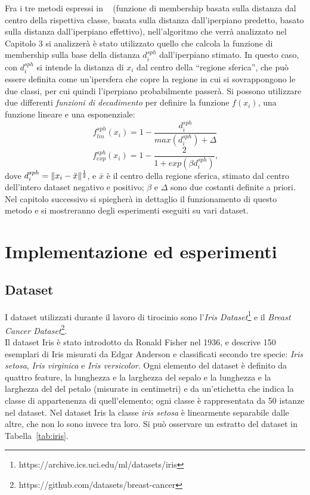 \documentclass[oneside, openany]{book}
\DeclarePairedDelimiter{\norma}{\lVert}{\rVert}
\begin{document}
	Fra i tre metodi espressi in ~\cite{bib:cil} (funzione di membership basata sulla distanza dal centro della rispettiva classe, basata sulla distanza dall'iperpiano predetto, basato sulla distanza dall'iperpiano effettivo), nell'algoritmo che verrà analizzato nel Capitolo 3 si analizzerà è stato utilizzato quello che calcola la funzione di membership sulla base della distanza $d_i^{sph}$ dall'iperpiano stimato. In questo caso, con $d_i^{sph}$ si intende la distanza di $x_i$ dal centro della ``regione sferica'', che può essere definita come un'ipersfera che copre la regione in cui si sovrappongono le due classi, per cui quindi l'iperpiano probabilmente passerà. Si possono utilizzare due differenti \textit{funzioni di decadimento} per definire la funzione $f(x_i)$, una funzione lineare e una esponenziale:
	\[
		f_{lin}	^{sph}(x_i) = 1 - \frac{d_i^{sph}}{max(d_i^{sph})+\Delta} 
	\]
	\[
		f_{exp}	^{sph}(x_i) = 1 - \frac{2}{1+exp(\beta d_i^{sph})}\text{,}
	\]
	dove $d_i^{sph}=\norma{x_i-\bar{x}}^{\frac{1}{2}}$, e $\bar{x}$ è il centro della regione sferica, stimato dal centro dell'intero dataset negativo e positivo; $\beta$ e $\Delta$ sono due costanti definite a priori. Nel capitolo successivo si spiegherà in dettaglio il funzionamento di questo metodo e si mostreranno degli esperimenti eseguiti su vari dataset.	

	\chapter{Implementazione ed esperimenti}
	\label{chap:3}
	\section{Dataset}
	I dataset utilizzati durante il lavoro di tirocinio sono l'\textit{Iris Dataset}\footnote{https://archive.ics.uci.edu/ml/datasets/iris} e il \textit{Breast Cancer Dataset}\footnote{https://github.com/datasets/breast-cancer}.\\
	Il dataset Iris è stato introdotto da Ronald Fisher nel 1936, e descrive 150 esemplari di Iris misurati da Edgar Anderson e classificati secondo tre specie: \textit{Iris setosa}, \textit{Iris virginica} e \textit{Iris versicolor}. Ogni elemento del dataset è definito da quattro feature, la lunghezza e la larghezza del sepalo e la lunghezza e la larghezza del del petalo (misurate in centimetri) e da un'etichetta che indica la classe di appartenenza di quell'elemento; ogni classe è rappresentata da 50 istanze nel dataset. Nel dataset Iris la classe \textit{iris setosa} è linearmente separabile dalle altre, che non lo sono invece tra loro. Si può osservare un estratto del dataset in Tabella~\ref{tab:iris}.
	
\end{document}

